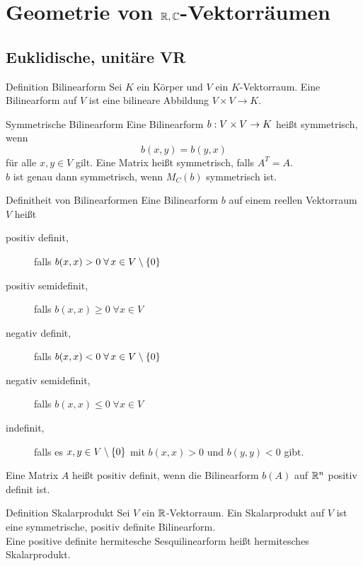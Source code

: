 \documentclass[main.tex]{subfiles}
\begin{document}
\section*{Geometrie von \(\mathbb{R}, \mathbb{C}\)-Vektorräumen}
\subsection*{Euklidische, unitäre VR}

\begin{karte}{Definition Bilinearform}
    Sei \(K\) ein Körper und \(V\) ein \(K\)-Vektorraum. 
    Eine Bilinearform auf \(V\) ist eine bilineare Abbildung 
    \(V \times V \rightarrow K\).\\
\end{karte}

\begin{karte}{Symmetrische Bilinearform}
    Eine Bilinearform \(b : V\times V \rightarrow K\) heißt symmetrisch,
    wenn
    \[ b(x,y) = b(y,x) \]
    für alle \(x, y \in V \) gilt. Eine Matrix heißt symmetrisch, 
    falls \(A^T = A\).\\
    \( b \) ist genau dann symmetrisch, wenn \( M_C(b) \) 
    symmetrisch ist.
\end{karte}

\begin{karte}{Definitheit von Bilinearformen}
    Eine Bilinearform \(b\) auf einem reellen Vektorraum \(V\) heißt
    \begin{description}
        \item[positiv definit,] falls \(b(x,x) > 0 \; \forall x \in V \setminus \set{0}\)
        \item[positiv semidefinit,] falls \(b(x,x) \geq 0 \; \forall x \in V\)
        \item[negativ definit,] falls \(b(x,x) < 0 \; \forall x \in V \setminus \set{0}\)
        \item[negativ semidefinit,] falls \(b(x,x) \leq 0 \; \forall x \in V\)
        \item[indefinit,] falls es \(x, y \in V \setminus \{0\}\) mit
        \(b(x,x) > 0\) und \(b(y,y) < 0\) gibt.  
    \end{description}
    Eine Matrix \(A\) heißt positiv definit, wenn
    die Bilinearform \( b(A) \) auf \(\mathbb{R}^n\) 
    positiv definit ist.
\end{karte}

\begin{karte}{Definition Skalarprodukt}
    Sei \(V\) ein \(\mathbb{R}\)-Vektorraum. Ein Skalarprodukt auf \(V\) ist eine
    symmetrische, positiv definite Bilinearform.\\
    Eine positive definite hermitesche Sesquilinearform heißt hermitesches Skalarprodukt.
\end{karte}
\end{document}
